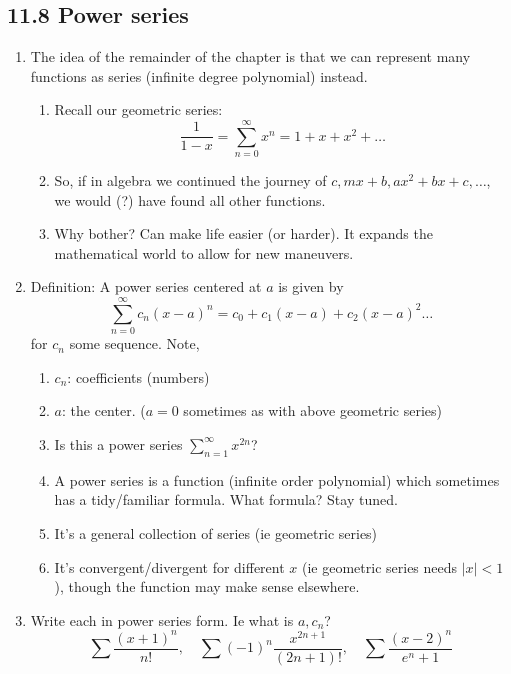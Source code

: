 \documentclass{article}
\begin{document}
\subsection{11.8 Power series}
\begin{enumerate}

\item The idea of the remainder of the chapter is that we can represent many functions as series (infinite degree polynomial) instead. 
\begin{enumerate}
\item Recall our geometric series:
\[
\frac{1}{1-x} = \sum_{n=0}^\infty x^n = 1 + x + x^2 + \dots
\]
\item So, if in algebra we continued the journey of $c, mx+b, ax^2+bx+c, \dots$, we would (?) have found all other functions. 
\item Why bother? Can make life easier (or harder). It expands the mathematical world to allow for new maneuvers.
\end{enumerate}

\item Definition: A power series centered at $a$ is given by
$$
\sum_{n=0}^\infty c_n(x-a)^n = c_0 + c_1(x-a) + c_2(x-a)^2 \dots
$$
for $c_n$ some sequence. Note,
\begin{enumerate}
\item $c_n$: coefficients (numbers)
\item $a$: the center. ($a = 0$ sometimes as with above geometric series)
\item Is this a power series $\displaystyle\sum_{n=1}^\infty x^{2n}$? 
\item A power series is a function (infinite order polynomial) which sometimes has a tidy/familiar formula. What formula? Stay tuned.
\item It's a general collection of series (ie geometric series)
\item It's convergent/divergent for different $x$ (ie geometric series needs $|x|<1$), though the function may make sense elsewhere.
\end{enumerate}

\item Write each in power series form. Ie what is $a, c_n$?
$$
\sum\frac{(x+1)^n}{n!}, \quad \sum(-1)^n\frac{x^{2n+1}}{(2n+1)!}, \quad \sum\frac{(x-2)^n}{e^n+1}
$$


\end{enumerate}
\end{document}
